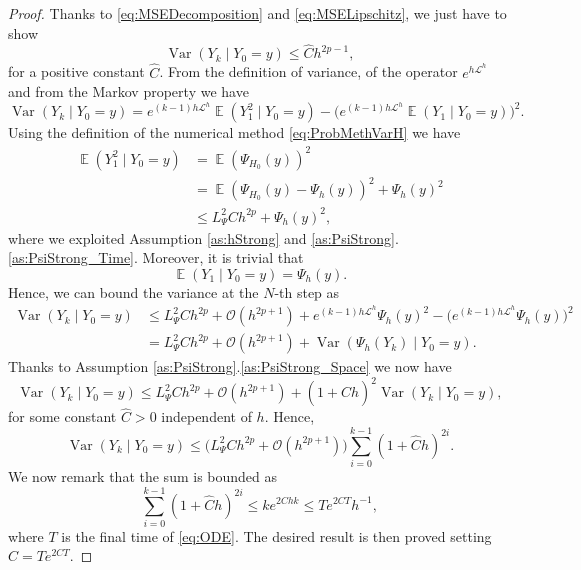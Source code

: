 \documentclass{siamart1116}
\numberwithin{theorem}{section}
\newcommand{\OO}{\mathcal{O}}
\newcommand{\diffL}{\mathcal{L}}
\newcommand{\Var}{\operatorname{Var}}
\newcommand{\E}{\operatorname{\mathbb{E}}}
\newcommand{\sksum}{\textstyle\sum}
\begin{document}
\begin{proof} Thanks to \eqref{eq:MSEDecomposition} and \eqref{eq:MSELipschitz}, we just have to show
	\begin{equation}
		\Var (Y_k \mid Y_0 = y) \leq \hat C h^{2p - 1},
	\end{equation}
	for a positive constant $\hat C$. From the definition of variance, of the operator $e^{h\diffL^h}$ and from the Markov property we have
	\begin{equation}
		\Var (Y_k \mid Y_0 = y) = e^{(k-1)h\diffL^h}\E(Y_1^2 \mid Y_0 = y) - \big(e^{(k-1)h\diffL^h}\E(Y_1\mid Y_0 = y)\big)^2.
	\end{equation}
	Using the definition of the numerical method \eqref{eq:ProbMethVarH} we have
	\begin{equation}
	\begin{aligned}
		\E(Y_1^2 \mid Y_0 = y) &= \E (\Psi_{H_0}(y))^2 \\
		&= \E(\Psi_{H_0}(y) - \Psi_h(y))^2 + \Psi_h(y)^2 \\
		&\leq L_\Psi^2 C h^{2p} + \Psi_h(y)^2,
	\end{aligned}
	\end{equation}
	where we exploited Assumption \ref{as:hStrong} and \ref{as:PsiStrong}.\ref{as:PsiStrong_Time}. Moreover, it is trivial that
	\begin{equation}
		\E(Y_1\mid Y_0 = y) = \Psi_h(y).
	\end{equation} 
	Hence, we can bound the variance at the $N$-th step as
	\begin{equation}
	\begin{aligned}
		\Var (Y_k \mid Y_0 = y) &\leq L_\Psi^2 Ch^{2p} + \OO(h^{2p + 1}) + e^{(k-1)h\diffL^h}\Psi_h(y)^2 - \big(e^{(k-1)h\diffL^h}\Psi_h(y)\big)^2 \\
		&= L_\Psi^2 Ch^{2p} + \OO(h^{2p + 1}) + \Var(\Psi_h(Y_k) \mid Y_0 = y).
	\end{aligned}
	\end{equation}
	Thanks to Assumption \ref{as:PsiStrong}.\ref{as:PsiStrong_Space} we now have
	\begin{equation}
		\Var (Y_k \mid Y_0 = y) \leq L_\Psi^2 Ch^{2p} + \OO(h^{2p + 1}) + (1 + \hat Ch)^2 \Var(Y_k \mid Y_0 = y),
	\end{equation}
	for some constant $\hat C > 0$ independent of $h$. Hence,
	\begin{equation}
		\Var (Y_k \mid Y_0 = y) \leq  \big(L_\Psi^2 Ch^{2p} + \OO(h^{2p + 1})\big) \sksum_{i=0}^{k-1} (1 + \hat Ch)^{2i}.
	\end{equation}
	We now remark that the sum is bounded as
	\begin{equation}
		\sksum_{i=0}^{k-1} (1 + \hat Ch)^{2i} \leq k e^{2Chk} \leq Te^{2CT}h^{-1},
	\end{equation}
	where $T$ is the final time of \eqref{eq:ODE}. The desired result is then proved setting $C = Te^{2CT}$.
\end{proof}
\end{document}
